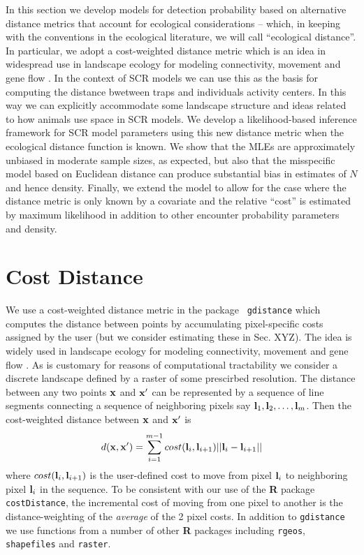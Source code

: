 In this section we develop models for detection probability based on
alternative distance metrics that account for ecological
considerations -- which, in keeping with the conventions in the ecological literature,
 we will call ``ecological distance''. In
particular, we adopt a cost-weighted distance metric which is an idea
in widespread use in 
landscape ecology for modeling connectivity, movement and gene flow
\citep{adriaensen_etal:2003,manel_etal:2003,mcrae_etal:2008}. In the context of SCR
models we can use this as the basis for computing the distance
bwetween traps and individuals activity centers. In this way we can
explicitly accommodate some landscape structure and ideas related to how animals
use space in SCR models. We develop a likelihood-based inference framework for SCR model parameters
using this new distance metric when the ecological distance function is known.  
We show that the MLEs are approximately unbiased in moderate sample
sizes, as expected, but also that the misspecific model based on Euclidean distance can produce
substantial bias in estimates of $N$ and hence density.
Finally, we extend the model to allow for the case where the distance metric is only known by a 
covariate and the relative ``cost'' is estimated by maximum likelihood in addition to other
encounter probability parameters and density. 



\section{Cost Distance}

We use a cost-weighted distance metric in the package \mbox{\tt
  gdistance}  which computes the distance between points by
accumulating pixel-specific costs assigned by the user (but we
consider estimating these in Sec. XYZ). The idea is widely used in
landscape ecology for modeling connectivity, movement and gene flow
\citep{adriaensen_etal:2003,mcrae_etal:2008}. As is customary for reasons of
computational tractability we consider a discrete landscape defined by a raster
of some prescirbed resolution. The distance between 
any two points ${\bf x}$ and ${\bf x}'$ can be represented by a sequence
of line segments connecting a sequence of neighboring 
pixels say ${\bf l}_{1},{\bf l}_{2},\ldots,{\bf l}_{m}$. Then the cost-weighted distance 
between ${\bf x}$ and ${\bf x}'$ is
\[
 d({\bf x},{\bf x}')
  =  \sum_{i=1}^{m-1} cost({\bf l}_{i},{\bf l}_{i+1})||{\bf l}_{i} - {\bf l}_{i+1}||
\]
where $cost({\bf l}_{i},{\bf l}_{i+1})$ is the user-defined cost to move from pixel 
${\bf l}_{i}$ to neighboring pixel ${\bf l}_{i}$ in the sequence.
To be consistent with our use 
of the {\bf R} package \mbox{\tt costDistance}, the
incremental cost of moving from one pixel to another is the
distance-weighting of the {\it average} of the 2 pixel costs.
In addition to \mbox{\tt gdistance} we use functions from a number of
other {\bf R} packages including \mbox{\tt rgeos}, \mbox{\tt
  shapefiles} and \mbox{\tt raster}.
  
